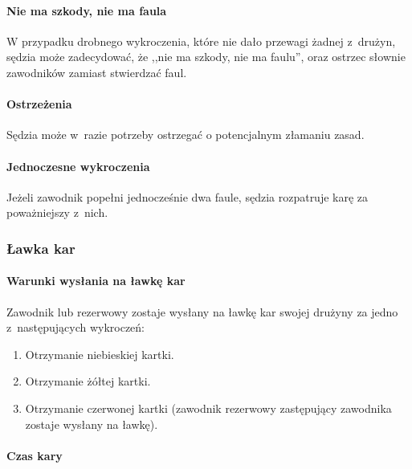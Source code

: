 \documentclass[12pt,a4paper]{article}
\begin{document}
\paragraph{Nie ma szkody, nie ma faula}
W przypadku drobnego
wykroczenia, które nie dało przewagi żadnej z~drużyn, sędzia może
zadecydować, że ,,nie ma szkody, nie ma faulu'', oraz ostrzec słownie
zawodników zamiast stwierdzać faul.

\paragraph{Ostrzeżenia}
Sędzia może w~razie potrzeby ostrzegać
o potencjalnym złamaniu zasad.

\paragraph{Jednoczesne wykroczenia}
Jeżeli zawodnik popełni
jednocześnie dwa faule, sędzia rozpatruje karę za poważniejszy z~nich.

\subsubsection{Ławka kar}

\paragraph{Warunki wysłania na ławkę kar}
Zawodnik lub rezerwowy
zostaje wysłany na ławkę kar swojej drużyny za jedno z~następujących
wykroczeń:

\begin{enumerate}
	\item Otrzymanie niebieskiej kartki.

	\item Otrzymanie żółtej kartki.

	\item Otrzymanie czerwonej kartki (zawodnik rezerwowy zastępujący zawodnika
	      zostaje wysłany na ławkę).
\end{enumerate}

\paragraph{Czas kary}
\end{document}
